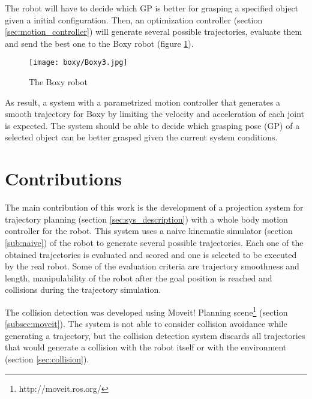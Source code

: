 The robot will have to decide which GP is better for grasping a specified object given a initial configuration. Then, an optimization controller (section \ref{sec:motion_controller}) will generate several possible trajectories, evaluate them and send the best one to the Boxy robot (figure \ref{fig:boxy}).

\begin{figure}[H]
	\centering
	\texttt{[image: boxy/Boxy3.jpg]}
	\vspace{-10pt}
	\caption{The Boxy robot}
	\vspace{-15pt}
	\label{fig:boxy}
\end{figure}

As result, a system with a parametrized motion controller that generates a smooth trajectory for Boxy by limiting the velocity and acceleration of each joint is expected. The system should be able to decide which grasping pose (GP) of a selected object can be better grasped given the current system conditions.


\section{Contributions}

The main contribution of this work is the development of a projection system for trajectory planning (section \ref{sec:sys_description}) with a whole body motion controller for the robot. This system uses a naive kinematic simulator (section \ref{sub:naive}) of the robot to generate several possible trajectories. Each one of the obtained trajectories is evaluated and scored and one is selected to be executed by the real robot. Some of the evaluation criteria are trajectory smoothness and length, manipulability of the robot after the goal position is reached and collisions during the trajectory simulation.

The collision detection was developed using Moveit! Planning scene\footnote{http://moveit.ros.org/} (section \ref{subsec:moveit}). The system is not able to consider collision avoidance while generating a trajectory, but the collision detection system discards all trajectories that would generate a collision with the robot itself or with the environment (section \ref{sec:collision}).

